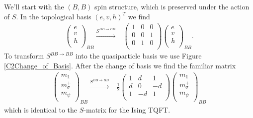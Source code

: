 \documentclass[12pt,a4paper]{article}
\newcounter{arrow}
\newcommand{\unit}{\mathds{1}}
\newcommand\be            {\begin{equation}}
\newcommand\ee            {\end{equation}}
\begin{document}
We'll start with the $(B,B)$ spin structure, which is preserved under the action of $S$. 
In the topological basis $(e,v,h)^T$ we find
\begin{align}
\left( \begin{matrix}
e\\
v\\
h\\
\end{matrix} \right)_{BB} 
\xrightarrow{S^{BB \rightarrow BB}} & \left( \begin{matrix}
1&0&0\\
0&0&1\\
0&1&0\\
\end{matrix} \right)
\left( \begin{matrix}
e\\
v\\
h\\
\end{matrix} \right)_{BB}.
\end{align}
To transform $S^{BB\rightarrow BB}$ into the quasiparticle basis we use Figure \ref{C2Change_of_Basis}.
After the change of basis we find the familiar matrix
\begin{align}
\left( \begin{matrix}
m_\unit\\
m_\sigma^+\\
m_\psi \\
\end{matrix} \right)_{BB} 
\xrightarrow{S^{BB \rightarrow BB}} &\frac{1}{2} \left( \begin{matrix}
1&d&1\\
d&0&-d\\
1&-d&1\\
\end{matrix} \right)
\left( \begin{matrix}
m_\unit\\
m_\sigma^+\\
m_\psi \\
\end{matrix} \right)_{BB}
\end{align}
which is identical to the $S$-matrix for the Ising TQFT. 
\end{document}
